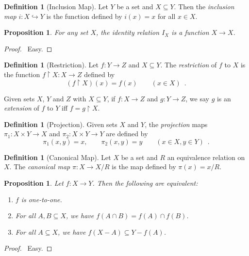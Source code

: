 \documentclass{report}
\let\qed\relax
\newtheorem{prop}[ax]{Proposition}
\theoremstyle{definition}
\newtheorem{df}[ax]{Definition}
\begin{document}
\begin{df}[Inclusion Map]
Let $Y$ be a set and $X \subseteq Y$. Then the \emph{inclusion map} $i : X \hookrightarrow Y$ is the function defined by $i(x) = x$ for all $x \in X$.
\end{df}

\begin{prop}
For any set $X$, the identity relation $I_X$ is a function $X \rightarrow X$.
\end{prop}

\begin{proof}
\pf\ Easy. \qed
\end{proof}

\begin{df}[Restriction]
Let $f : Y \rightarrow Z$ and $X \subseteq Y$. The \emph{restriction} of $f$ to $X$ is the function $f \restriction X : X \rightarrow Z$ defined by
\[ (f \restriction X)(x) = f(x) \qquad (x \in X) \enspace . \]

Given sets $X$, $Y$ and $Z$ with $X \subseteq Y$, if $f : X \rightarrow Z$ and $g : Y \rightarrow Z$, we say $g$ is an \emph{extension} of $f$ to $Y$ iff $f = g \restriction X$.
\end{df}

\begin{df}[Projection]
Given sets $X$ and $Y$, the \emph{projection} maps $\pi_1 : X \times Y \rightarrow X$ and $\pi_2 : X \times Y \rightarrow Y$ are defined by
\[ \pi_1(x,y) = x, \qquad \pi_2(x,y) = y \qquad (x \in X, y \in Y) \enspace . \]
\end{df}

\begin{df}[Canonical Map]
Let $X$ be a set and $R$ an equivalence relation on $X$. The \emph{canonical map} $\pi : X \rightarrow X / R$ is the map defined by $\pi(x) = x / R$.
\end{df}

\begin{prop}
Let $f : X \rightarrow Y$. Then the following are equivalent:
\begin{enumerate}
\item $f$ is one-to-one.
\item For all $A,B \subseteq X$, we have $f(A \cap B) = f(A) \cap f(B)$.
\item For all $A \subseteq X$, we have $f(X-A) \subseteq Y - f(A)$.
\end{enumerate}
\end{prop}

\begin{proof}
\pf\ Easy. \qed
\end{proof}
\end{document}
